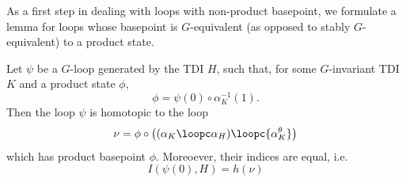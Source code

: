 As a first step in dealing with loops with non-product basepoint, we formulate a lemma for loops whose basepoint is $G$-equivalent (as opposed to stably $G$-equivalent) to a product state. 
\begin{lemma}\label{lem: loops with prod equiv}
	Let $\psi$ be a $G$-loop generated by the TDI $H$, such that, for some  $G$-invariant TDI $K$ and a product state $\phi$, 
	$$\phi=\psi(0)\circ \alpha^{-1}_K(1).$$ 
	Then the loop $\psi$ is homotopic to the loop 
	\begin{equation} \label{eq: def loop three parts}
		\nu=\phi \circ \left(({\alpha_{K}} \loopc \alpha_{H}) \loopc  {\alpha^\theta_{K}}\right)
	\end{equation}
	which has product basepoint $\phi$. Moreoever, their indices are equal, i.e.\
	\begin{equation} \label{eq: equality index inter}
		I(\psi(0),H)=h(\nu)
	\end{equation} 
\end{lemma}
